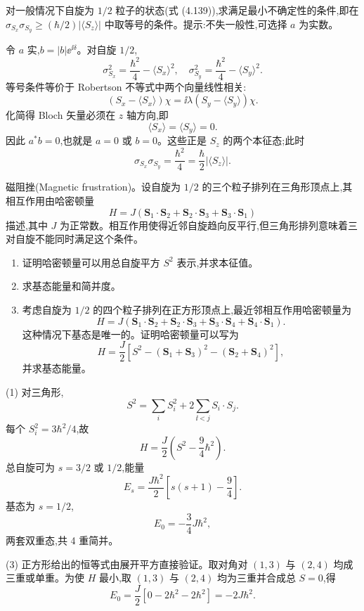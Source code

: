 \begin{question}
对一般情况下自旋为 $1/2$ 粒子的状态(式 (4.139)),求满足最小不确定性的条件,即在 $\sigma_{S_x}\sigma_{S_y}\ge(\hbar/2)|\langle S_z\rangle|$ 中取等号的条件。提示:不失一般性,可选择 $a$ 为实数。

\par\smallskip
{}

\end{question}
\begin{solution}

令 $a$ 实,$b=|b|\ee^{\ii\delta}$。对自旋 $1/2$,
\[
\sigma_{S_x}^2=\frac{\hbar^2}{4}-\langle S_x\rangle^2,
\quad
\sigma_{S_y}^2=\frac{\hbar^2}{4}-\langle S_y\rangle^2.
\]
等号条件等价于 Robertson 不等式中两个向量线性相关:
\[
(S_x-\langle S_x\rangle)\chi=\ii\lambda(S_y-\langle S_y\rangle)\chi.
\]
化简得 Bloch 矢量必须在 $z$ 轴方向,即
\[
\langle S_x\rangle=
\langle S_y\rangle=0.
\]
因此 $a^*b=0$,也就是 $a=0$ 或 $b=0$。这些正是 $S_z$ 的两个本征态;此时
\[
\sigma_{S_x}\sigma_{S_y}=\frac{\hbar^2}{4}=\frac\hbar2|\langle S_z\rangle|.
\]

\end{solution}

\begin{question}
磁阻挫(Magnetic frustration)。设自旋为 $1/2$ 的三个粒子排列在三角形顶点上,其相互作用由哈密顿量
\[
H=J(\mathbf S_1\cdot\mathbf S_2+\mathbf S_2\cdot\mathbf S_3+\mathbf S_3\cdot\mathbf S_1)
\]
描述,其中 $J$ 为正常数。相互作用使得近邻自旋趋向反平行,但三角形排列意味着三对自旋不能同时满足这个条件。
\begin{enumerate}
\item 证明哈密顿量可以用总自旋平方 $S^2$ 表示,并求本征值。
\item 求基态能量和简并度。
\item 考虑自旋为 $1/2$ 的四个粒子排列在正方形顶点上,最近邻相互作用哈密顿量为
\[
H=J(\mathbf S_1\cdot\mathbf S_2+\mathbf S_2\cdot\mathbf S_3+\mathbf S_3\cdot\mathbf S_4+\mathbf S_4\cdot\mathbf S_1).
\]
这种情况下基态是唯一的。证明哈密顿量可以写为
\[
H=\frac{J}{2}\left[S^2-(\mathbf S_1+\mathbf S_3)^2-(\mathbf S_2+\mathbf S_4)^2\right],
\]
并求基态能量。
\end{enumerate}
\end{question}
\begin{solution}

(1) 对三角形,
\[
S^2=\sum_iS_i^2+2\sum_{\ii<j}S_i\cdot S_j.
\]
每个 $S_i^2=3\hbar^2/4$,故
\[
H=\frac{J}{2}\left(S^2-\frac{9}{4}\hbar^2\right).
\]
总自旋可为 $s=3/2$ 或 $1/2$,能量
\[
E_s=\frac{J\hbar^2}{2}\left[s(s+1)-\frac94\right].
\]
基态为 $s=1/2$,
\[
E_0=-\frac34J\hbar^2,
\]
两套双重态,共 4 重简并。

(3) 正方形给出的恒等式由展开平方直接验证。取对角对 $(1,3)$ 与 $(2,4)$ 均成三重或单重。为使 $H$ 最小,取 $(1,3)$ 与 $(2,4)$ 均为三重并合成总 $S=0$,得
\[
E_0=\frac{J}{2}[0-2\hbar^2-2\hbar^2]=-2J\hbar^2.
\]

\end{solution}

